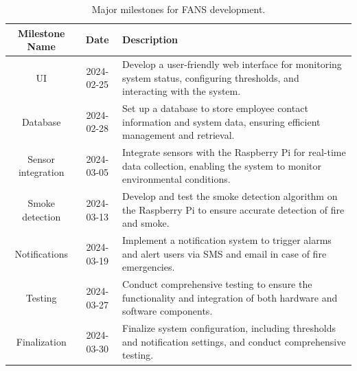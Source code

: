 \begin{table}[H]
    \centering
    \begin{tabular}{| c | c | p{9cm} |}
        \hline
        \textbf{Milestone Name} & \textbf{Date} & \textbf{Description}                                                                            \\
        \hline
        UI                      & 2024-02-25    & Develop a user-friendly web interface for monitoring system status, configuring thresholds, and
        interacting with the system.                                                                                                              \\
        \hline Database         & 2024-02-28    & Set up a database to store employee contact information
        and system data, ensuring efficient management and retrieval.                                                                             \\
        \hline
        Sensor integration      & 2024-03-05    & Integrate sensors with the Raspberry Pi for real-time data collection, enabling the
        system to monitor environmental conditions.                                                                                               \\
        \hline Smoke detection  & 2024-03-13    & Develop and test
        the smoke detection algorithm on the Raspberry Pi to ensure accurate detection of fire and smoke.                                         \\
        \hline
        Notifications           & 2024-03-19    & Implement a notification system to trigger alarms and alert users via SMS and email
        in case of fire emergencies.                                                                                                              \\
        \hline
        Testing                 & 2024-03-27    & Conduct comprehensive testing to ensure the functionality and integration of both
        hardware and software components.                                                                                                         \\
        \hline
        Finalization            & 2024-03-30    & Finalize system configuration, including thresholds and notification settings, and
        conduct comprehensive testing.                                                                                                            \\
        \hline
    \end{tabular}
    \caption{Major milestones for FANS development.}
\end{table}

